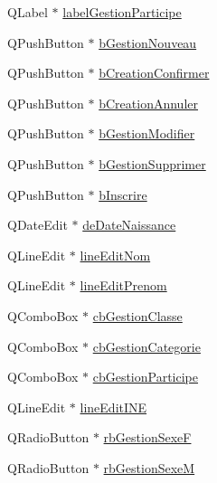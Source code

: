 \begin{DoxyCompactItemize}
\item 
Q\+Label $\ast$ \hyperlink{class_i_h_m_gestion_cross_a0106cdcaf86997642d48dfad96a2368f}{label\+Gestion\+Participe}
\item 
Q\+Push\+Button $\ast$ \hyperlink{class_i_h_m_gestion_cross_ab987235a79961d3d186878052a02b21b}{b\+Gestion\+Nouveau}
\item 
Q\+Push\+Button $\ast$ \hyperlink{class_i_h_m_gestion_cross_aac8a7363e20bc9ba2f65b7d9b3bc856e}{b\+Creation\+Confirmer}
\item 
Q\+Push\+Button $\ast$ \hyperlink{class_i_h_m_gestion_cross_a297a77054dc0f54e461c0f9b0382efb3}{b\+Creation\+Annuler}
\item 
Q\+Push\+Button $\ast$ \hyperlink{class_i_h_m_gestion_cross_a524ced9992dcc4e7ee25b01e30c4c5df}{b\+Gestion\+Modifier}
\item 
Q\+Push\+Button $\ast$ \hyperlink{class_i_h_m_gestion_cross_adc5bed6caf7f597dd30999bc871e695b}{b\+Gestion\+Supprimer}
\item 
Q\+Push\+Button $\ast$ \hyperlink{class_i_h_m_gestion_cross_a1afbc04ebd42deafebbbdc998d0fc246}{b\+Inscrire}
\item 
Q\+Date\+Edit $\ast$ \hyperlink{class_i_h_m_gestion_cross_a1c63c5c91be88aef13d2582e48dff7d0}{de\+Date\+Naissance}
\item 
Q\+Line\+Edit $\ast$ \hyperlink{class_i_h_m_gestion_cross_a633102626c5dedd575b51a1ba5c6e708}{line\+Edit\+Nom}
\item 
Q\+Line\+Edit $\ast$ \hyperlink{class_i_h_m_gestion_cross_a7bea7529f01cf8ca8f365d418aae52d5}{line\+Edit\+Prenom}
\item 
Q\+Combo\+Box $\ast$ \hyperlink{class_i_h_m_gestion_cross_af734c4b13942dd83fbbd0355e3728c9f}{cb\+Gestion\+Classe}
\item 
Q\+Combo\+Box $\ast$ \hyperlink{class_i_h_m_gestion_cross_a60cdc44c61bcd4e1e189c8de5556b89e}{cb\+Gestion\+Categorie}
\item 
Q\+Combo\+Box $\ast$ \hyperlink{class_i_h_m_gestion_cross_a89aff3b1c5d5198dd7aaecd932331e0d}{cb\+Gestion\+Participe}
\item 
Q\+Line\+Edit $\ast$ \hyperlink{class_i_h_m_gestion_cross_ab6c32fd079f81c4fa0b9ec0b4ef9bb61}{line\+Edit\+I\+NE}
\item 
Q\+Radio\+Button $\ast$ \hyperlink{class_i_h_m_gestion_cross_a4474ef47310eb3511befdf1beaa18b56}{rb\+Gestion\+SexeF}
\item 
Q\+Radio\+Button $\ast$ \hyperlink{class_i_h_m_gestion_cross_a7d471a7f96862dcd302f7f8cc52dfea4}{rb\+Gestion\+SexeM}
\item 

\end{DoxyCompactItemize}
